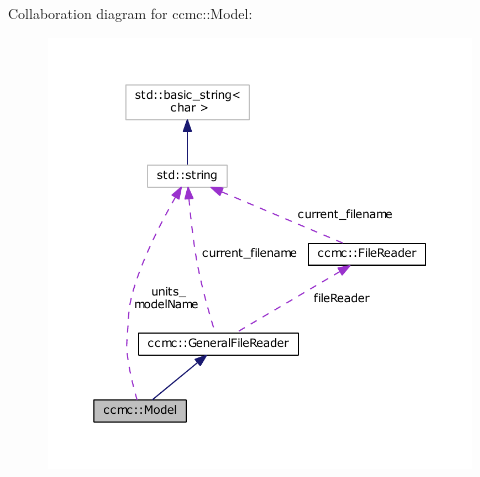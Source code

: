 Collaboration diagram for ccmc\-:\-:Model\-:\nopagebreak
\begin{figure}[H]
\begin{center}
\leavevmode
\includegraphics[width=350pt]{classccmc_1_1_model__coll__graph}
\end{center}
\end{figure}
